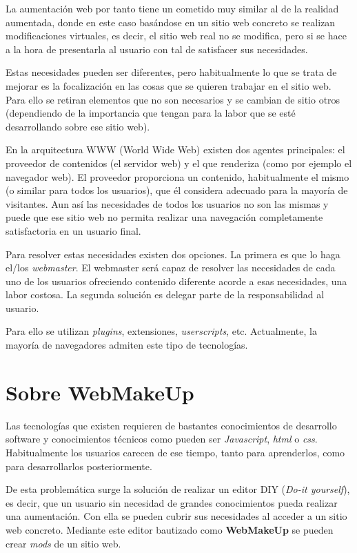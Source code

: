 La aumentación web por tanto tiene un cometido muy similar al de la realidad aumentada, donde en este caso basándose en un sitio web concreto se realizan modificaciones virtuales, es decir, el sitio web real no se modifica, pero si se hace a la hora de presentarla al usuario con tal de satisfacer sus necesidades.

Estas necesidades pueden ser diferentes, pero habitualmente lo que se trata de mejorar es la focalización en las cosas que se quieren trabajar en el sitio web. Para ello se retiran elementos que no son necesarios y se cambian de sitio otros (dependiendo de la importancia que tengan para la labor que se esté desarrollando sobre ese sitio web).

En la arquitectura WWW (World Wide Web) existen dos agentes principales: el proveedor de contenidos (el servidor web) y el que renderiza (como por ejemplo el navegador web). El proveedor proporciona un contenido, habitualmente el mismo (o similar para todos los usuarios), que él considera adecuado para la mayoría de visitantes. Aun así las necesidades de todos los usuarios no son las mismas y puede que ese sitio web no permita realizar una navegación completamente satisfactoria en un usuario final.

Para resolver estas necesidades existen dos opciones. La primera es que lo haga el/los \emph{webmaster}. El webmaster será capaz de resolver las necesidades de cada uno de los usuarios ofreciendo contenido diferente acorde a esas necesidades, una labor costosa. La segunda solución es delegar parte de la responsabilidad al usuario.

Para ello se utilizan \emph{plugins}, extensiones, \emph{userscripts}, etc. Actualmente, la mayoría de navegadores admiten este tipo de tecnologías.


\section{Sobre WebMakeUp}
\label{sec:SobreWebMakeUp}

Las tecnologías que existen requieren de bastantes conocimientos de desarrollo software y conocimientos técnicos como pueden ser \emph{Javascript}, \emph{html} o \emph{css}. Habitualmente los usuarios carecen de ese tiempo, tanto para aprenderlos, como para desarrollarlos posteriormente.

De esta problemática surge la solución de realizar un editor DIY (\emph{Do-it yourself}), es decir, que un usuario sin necesidad de grandes conocimientos pueda realizar una aumentación. Con ella se pueden cubrir sus necesidades al acceder a un sitio web concreto. Mediante este editor bautizado como \textbf{WebMakeUp} se pueden crear \emph{mods} de un sitio web.

